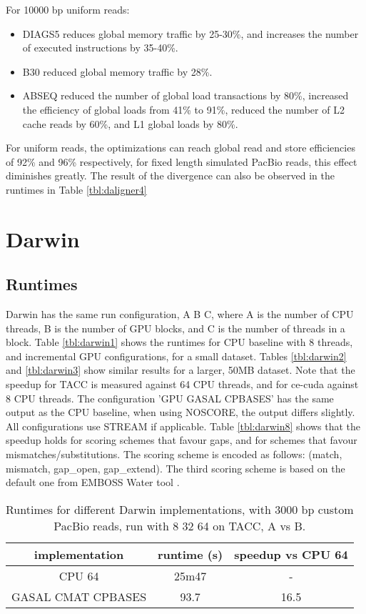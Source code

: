 \documentclass[../thesis.tex]{subfiles}
\begin{document}
For 10000 bp uniform reads:
\begin{itemize}
\item DIAGS5 reduces global memory traffic by 25-30\%, and increases the number of executed instructions by 35-40\%. \vspace{-10pt}
\item B30 reduced global memory traffic by 28\%. \vspace{-10pt}
\item ABSEQ reduced the number of global load transactions by 80\%, increased the efficiency of global loads from 41\% to 91\%, reduced the number of L2 cache reads by 60\%, and L1 global loads by 80\%.
\end{itemize}

For uniform reads, the optimizations can reach global read and store efficiencies of 92\% and 96\% respectively, for fixed length simulated PacBio reads, this effect diminishes greatly.
The result of the divergence can also be observed in the runtimes in Table \ref{tbl:daligner4}

\newpage

\section{Darwin}
\subsection{Runtimes}
Darwin has the same run configuration, A B C, where A is the number of CPU threads, B is the number of GPU blocks, and C is the number of threads in a block.
Table \ref{tbl:darwin1} shows the runtimes for CPU baseline with 8 threads, and incremental GPU configurations, for a small dataset.
Tables \ref{tbl:darwin2} and \ref{tbl:darwin3} show similar results for a larger, 50MB dataset.
Note that the speedup for TACC is measured against 64 CPU threads, and for ce-cuda against 8 CPU threads.
The configuration 'GPU GASAL CPBASES' has the same output as the CPU baseline, when using NOSCORE, the output differs slightly.
All configurations use STREAM if applicable.
Table \ref{tbl:darwin8} shows that the speedup holds for scoring schemes that favour gaps, and for schemes that favour mismatches/substitutions.
The scoring scheme is encoded as follows: (match, mismatch, gap\_open, gap\_extend).
The third scoring scheme is based on the default one from EMBOSS Water tool \cite{emboss}.

\begin{table}
\centering
\caption{Runtimes for different Darwin implementations, with 3000 bp custom PacBio reads, run with 8 32 64 on TACC, A vs B.}
\label{tbl:darwin0}
\begin{tabular}{c c c}
implementation & runtime (s) & speedup vs CPU 64 \\ \hline
CPU 64 & 25m47 & -\\
GASAL CMAT CPBASES & 93.7 & 16.5 \\
\end{tabular}
\end{table}
\end{document}
